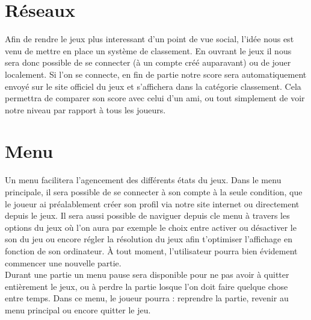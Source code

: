 \documentclass [11pt]{report}
\begin{document}
	\section {Réseaux}
		Afin de rendre le jeux plus interessant d'un point de vue social, l'idée nous est venu de mettre en place un système de classement. En ouvrant le jeux il nous sera donc possible de se connecter (à un compte créé auparavant) ou de jouer localement. Si l'on se connecte, en fin de partie notre score sera automatiquement envoyé sur 		le site officiel du jeux et s'affichera dans la catégorie classement. Cela permettra de comparer son score avec celui d'un ami, ou tout simplement de voir notre niveau par rapport à tous les joueurs.\\\vspace{5mm}


	\section {Menu}
		Un menu facilitera l'agencement des différents états du jeux. Dans le menu principale, il sera possible de se connecter à son compte à la seule condition, que le joueur ai préalablement créer son profil via notre site internet ou directement depuis le jeux. Il sera aussi possible de naviguer depuis cle menu à travers les options du jeux 		où l'on aura par exemple le choix entre activer ou désactiver le son du jeu ou encore régler la résolution du jeux afin t'optimiser l'affichage en fonction de son ordinateur. \`A tout moment, l'utilisateur pourra bien évidement commencer une nouvelle partie. \\
		\indent Durant une partie un menu pause sera disponible pour ne pas avoir à quitter entièrement le jeux, ou à perdre la partie losque l'on doit faire quelque chose entre temps. Dans ce menu, le joueur pourra : reprendre la partie, revenir au menu principal ou encore quitter le jeu.\\\vspace{5mm}
\end{document}
